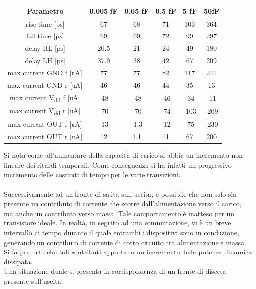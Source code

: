 \documentclass[11pt,  english, makeidx, a4paper, titlepage, oneside]{book}
\begin{document}
\\\\
\begin{center}
	\begin{tabular}{|c|c|c|c|c|c|}
	\hline
	Parametro & 0.005 fF & 0.05 fF & 0.5 fF & 5 fF & 50fF \\
	\hline
	rise time [ps] & 67 & 68 & 71 & 103 & 364\\
	\hline
	 fall time [ps] & 69 & 69 & 72 & 99 & 297 \\
	\hline
	delay HL [ps] & 20.5 & 21 & 24 & 49 & 180 \\
	\hline
	delay LH [ps] & 37.9 & 38 & 42 & 67 & 209 \\
	\hline
	max current GND f [uA] & 77 & 77 & 82 & 117 & 241 \\
	\hline
	max current GND r [uA] & 46 & 46 & 44 & 35 & 13\\
	\hline
	max current V\textsubscript{dd} f [uA] & -48 & -48 & -46 & -34 & -11\\
	\hline
	max current V\textsubscript{dd} r [uA] & -70 & -70 & -74 & -103 & -209 \\
	\hline
	max current OUT f [uA] & -13 & -1.3 & -12 & -75 & -230 \\
	\hline
	max current OUT r [uA] & 12 & 1.1 & 11 & 67 & 200\\
	\hline
	\end{tabular}	
\end{center}
\vspace{0.3cm}
Si nota come all'aumentare della capacità di carico si abbia un incremento non lineare dei ritardi temporali. Come conseguenza si ha infatti un progressivo incremento delle costanti di tempo per le varie transizioni.
\\\\
Successivamente ad un fronte di salita sull'uscita, è possibile che non solo sia presente un contributo di corrente che scorre dall'alimentazione verso il carico, ma anche un contributo verso massa. Tale comportamento è inatteso per un transistore ideale. In realtà, in seguito ad una commutazione, vi è un breve intervallo di tempo durante il quale entrambi i dispositivi sono in conduzione, generando un contributo di corrente di corto circuito tra alimentazione e massa. Si fa presente che tali contributi apportano un incremento della potenza dinamica dissipata.
\\
Una situazione duale si presenta in corrispondenza di un fronte di discesa presente sull'uscita.
\\\\
\end{document}
